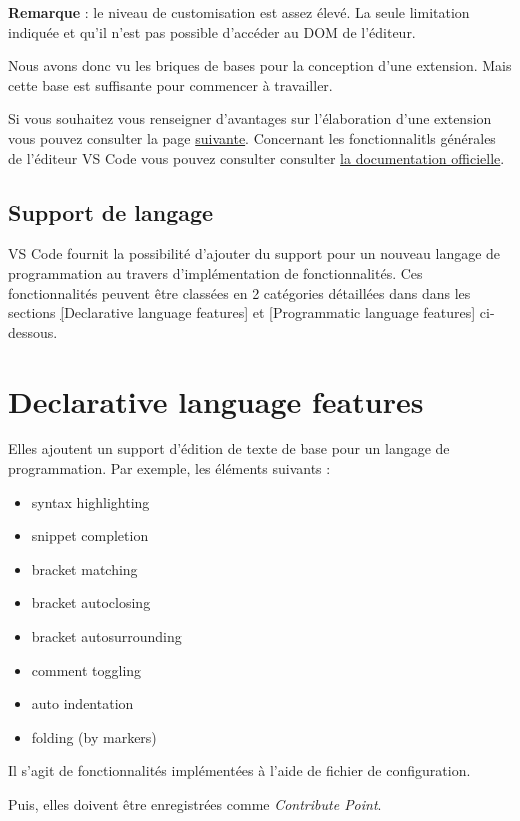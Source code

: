 \documentclass[
    iict, %
    il, %
]{heig-tb}
\begin{document}
\textbf{Remarque} : le niveau de customisation est assez élevé. La seule limitation indiquée et qu'il n'est pas possible d'accéder au DOM de l'éditeur.

Nous avons donc vu les briques de bases pour la conception d'une extension. Mais cette base est suffisante pour commencer à travailler.

Si vous souhaitez vous renseigner d'avantages sur l'élaboration d'une extension vous pouvez consulter la page \href{https://code.visualstudio.com/api}{suivante}.
Concernant les fonctionnalitls générales de l'éditeur VS Code vous pouvez consulter consulter \href{https://code.visualstudio.com/docs}{la documentation officielle}.

\subsection{Support de langage}
VS Code fournit la possibilité d'ajouter du support pour un nouveau langage de programmation au travers d'implémentation de fonctionnalités. Ces fonctionnalités peuvent être classées en 2 catégories détaillées
dans dans les sections \hyperref[Declarative language features][Declarative language features] et \hyperref[Programmatic language features][Programmatic language features] ci-dessous.

\section{Declarative language features}\label{Declarative language features}
Elles ajoutent un support d'édition de texte de base pour un langage de programmation.
Par exemple, les éléments suivants :

\begin{itemize}
    \item syntax highlighting
    \item snippet completion
    \item bracket matching
    \item bracket autoclosing
    \item bracket autosurrounding
    \item comment toggling
    \item auto indentation
    \item folding (by markers)
\end{itemize}

Il s'agit de fonctionnalités implémentées à l'aide de fichier de configuration.

Puis, elles doivent être enregistrées comme \emph{Contribute Point}.
\end{document}
